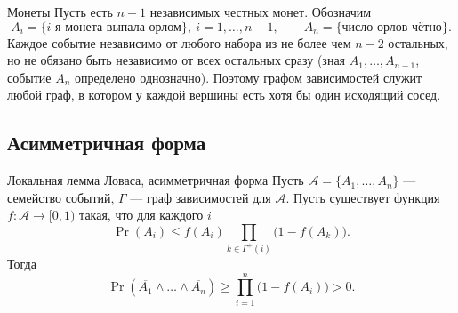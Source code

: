 \begin{Example}{Монеты}{}
	Пусть есть $n-1$ независимых честных монет. Обозначим
	\[
	A_i=\{\text{$i$-я монета выпала орлом}\},\ i=1,\dots,n-1,
	\qquad
	A_n=\{\text{число орлов чётно}\}.
	\]
	Каждое событие независимо от любого набора из не более чем $n-2$ остальных, но не обязано быть независимо от всех остальных сразу (зная $A_1,\dots,A_{n-1}$, событие $A_n$ определено однозначно). Поэтому графом зависимостей служит любой граф, в котором у каждой вершины есть хотя бы один исходящий сосед.
\end{Example}

\subsection{Асимметричная форма}

\begin{Theorem}{Локальная лемма Ловаса, асимметричная форма}{}
	Пусть $\mathcal A=\{A_1,\dots,A_n\}$ — семейство событий, $\Gamma$ — граф зависимостей для $\mathcal A$.
	Пусть существует функция $f:\mathcal A \to [0,1)$ такая, что для каждого $i$
	\[
	\Pr(A_i)\le f(A_i)\prod_{k\in \Gamma^+(i)}\bigl(1-f(A_k)\bigr).
	\]
	Тогда
	\[
	\Pr\!\left(\overline{A_1}\wedge \dots \wedge \overline{A_n}\right)\ge\prod_{i=1}^{n}\bigl(1-f(A_i)\bigr)>0.
	\]
\end{Theorem}

